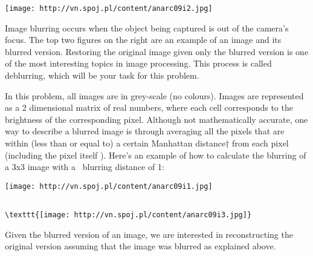 \texttt{[image: http://vn.spoj.pl/content/anarc09i2.jpg]}

   Image blurring occurs when the object being captured is out of the camera’s focus. The top two figures on the right are an example of an image and its blurred version. Restoring the original image given only the blurred version is one of the most interesting topics in image processing. This process is called deblurring, which will be your task for this problem.  




   In this problem, all images are in grey-scale (no colours). Images are represented as a 2 dimensional matrix of real numbers, where each cell corresponds to the  brightness of the corresponding pixel. Although not mathematically accurate, one way to describe a blurred image is through averaging all the pixels that are within (less than or equal to) a certain Manhattan distance† from each pixel (including the pixel itself ). Here’s an example of how to calculate the blurring of a 3x3 image with a  blurring distance of 1:  


\texttt{[image: http://vn.spoj.pl/content/anarc09i1.jpg]}
\begin{verbatim}

\texttt{[image: http://vn.spoj.pl/content/anarc09i3.jpg]}\end{verbatim}

   Given the blurred version of an image, we are interested in reconstructing the original version assuming that the image was blurred as explained above.